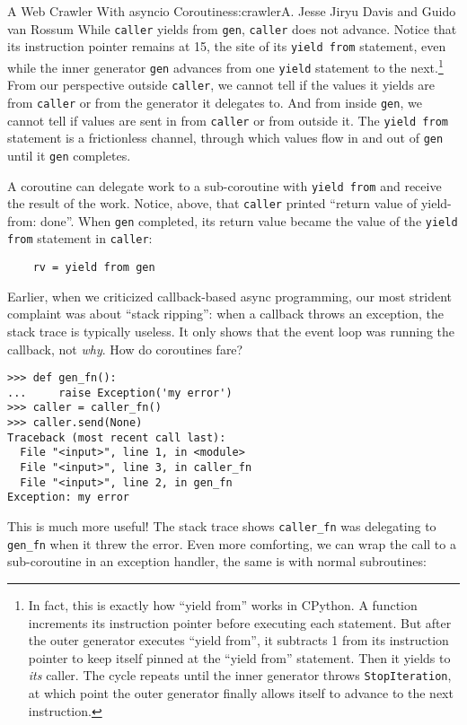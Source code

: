 \begin{aosachapter}{A Web Crawler With asyncio Coroutines}{s:crawler}{A. Jesse Jiryu Davis and Guido van Rossum}
While \texttt{caller} yields from \texttt{gen}, \texttt{caller} does not
advance. Notice that its instruction pointer remains at 15, the site of
its \texttt{yield from} statement, even while the inner generator
\texttt{gen} advances from one \texttt{yield} statement to the
next.\footnote{In fact, this is exactly how ``yield from'' works in
  CPython. A function increments its instruction pointer before
  executing each statement. But after the outer generator executes
  ``yield from'', it subtracts 1 from its instruction pointer to keep
  itself pinned at the ``yield from'' statement. Then it yields to
  \emph{its} caller. The cycle repeats until the inner generator throws
  \texttt{StopIteration}, at which point the outer generator finally
  allows itself to advance to the next instruction.} From our
perspective outside \texttt{caller}, we cannot tell if the values it
yields are from \texttt{caller} or from the generator it delegates to.
And from inside \texttt{gen}, we cannot tell if values are sent in from
\texttt{caller} or from outside it. The \texttt{yield from} statement is
a frictionless channel, through which values flow in and out of
\texttt{gen} until it \texttt{gen} completes.

A coroutine can delegate work to a sub-coroutine with
\texttt{yield from} and receive the result of the work. Notice, above,
that \texttt{caller} printed ``return value of yield-from: done''. When
\texttt{gen} completed, its return value became the value of the
\texttt{yield from} statement in \texttt{caller}:

\begin{verbatim}
    rv = yield from gen
\end{verbatim}

Earlier, when we criticized callback-based async programming, our most
strident complaint was about ``stack ripping'': when a callback throws
an exception, the stack trace is typically useless. It only shows that
the event loop was running the callback, not \emph{why}. How do
coroutines fare?

\begin{verbatim}
>>> def gen_fn():
...     raise Exception('my error')
>>> caller = caller_fn()
>>> caller.send(None)
Traceback (most recent call last):
  File "<input>", line 1, in <module>
  File "<input>", line 3, in caller_fn
  File "<input>", line 2, in gen_fn
Exception: my error
\end{verbatim}

This is much more useful! The stack trace shows \texttt{caller\_fn} was
delegating to \texttt{gen\_fn} when it threw the error. Even more
comforting, we can wrap the call to a sub-coroutine in an exception
handler, the same is with normal subroutines:


\end{aosachapter}

